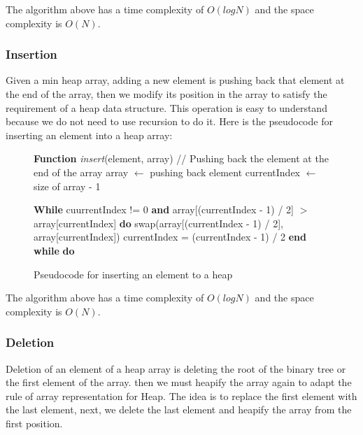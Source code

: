 \documentclass{assignment}
\begin{document}
The algorithm above has a time complexity of $O(logN)$ and the space complexity is $O(N)$.

\newpage
\subsubsection{Insertion}

Given a min heap array, adding a new element is pushing back that element at the end of the array, then we modify its position in the array to satisfy the requirement of a heap data structure. This operation is easy to understand because we do not need to use recursion to do it. Here is the pseudocode for inserting an element into a heap array:

\begin{figure}[htbp]
    \centering
    \begin{mdframed}
      \begin{algorithmic}
    \STATE \textbf{Function} \textit{insert}(element, array)
	\STATE \hspace*{0.5cm} // Pushing back the element at the end of the array
	\STATE \hspace*{0.5cm} array $\gets$ pushing back element
	\STATE \hspace*{0.5cm} currentIndex $\gets$ size of array - 1	
	
	\STATE
	\STATE \hspace*{0.5cm} \textbf{While} cuurrentIndex != 0 \textbf{and} array[(currentIndex - 1) / 2] $>$ array[currentIndex] \textbf{do}
	\STATE \hspace*{1cm} swap(array[(currentIndex - 1) / 2], array[currentIndex])
	\STATE \hspace*{1cm} currentIndex = (currentIndex - 1) / 2
	\STATE \hspace*{0.5cm} \textbf{end while}  \textbf{do}
\end{algorithmic}
    \end{mdframed}
    \caption{Pseudocode for inserting an element to a heap}
    \label{fig:fig20}
 \end{figure}

The algorithm above has a time complexity of $O(logN)$ and the space complexity is $O(N)$.


\subsubsection{Deletion}
Deletion of an element of a heap array is deleting the root of the binary tree or the first element of the array. then we must heapify the array again to adapt the rule of array representation for Heap. The idea is to replace the first element with the last element, next, we delete the last element and heapify the array from the first position. 
\end{document}
